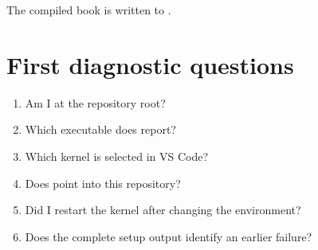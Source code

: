 The compiled book is written to
.

\section{First diagnostic questions}

\begin{enumerate}
  \item Am I at the repository root?
  \item Which executable does  report?
  \item Which kernel is selected in VS Code?
  \item Does  point into this repository?
  \item Did I restart the kernel after changing the environment?
  \item Does the complete setup output identify an earlier failure?
\end{enumerate}
